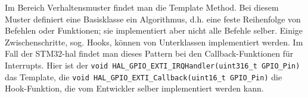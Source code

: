 Im Bereich Verhaltensmuster findet man die Template Method.
Bei diesem Muster definiert eine Basisklasse ein Algorithmus, d.h. eine feste Reihenfolge von Befehlen oder Funktionen; sie implementiert aber nicht alle Befehle selber.
Einige Zwischenschritte, sog. Hooks, können von Unterklassen implementiert werden.
Im Fall der STM32-\gls{hal} findet man dieses Pattern bei den Callback-Funktionen für Interrupts.
Hier ist der \texttt{void HAL\_GPIO\_EXTI\_IRQHandler(uint316\_t GPIO\_Pin)} das Template, die \texttt{void HAL\_GPIO\_EXTI\_Callback(uint16\_t GPIO\_Pin)} die Hook-Funktion, die vom Entwickler selber implementiert werden kann.





